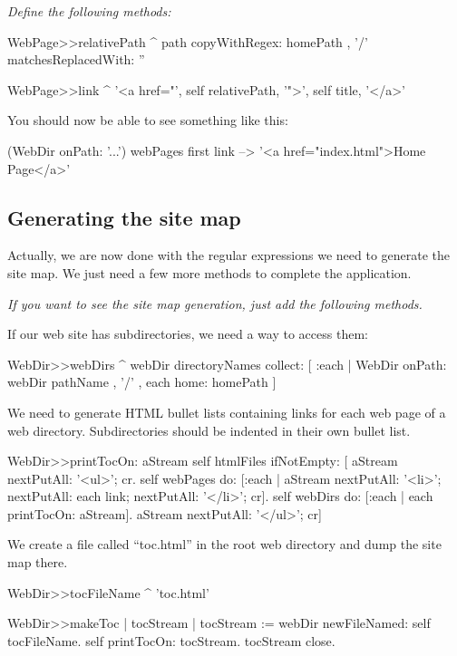 \documentclass[10pt,twoside,chapterprefix=false]{scrbook}
\newcommand{\highlight}[1]{\textcolor{blue!65}{#1}}
\newcommand{\MarginLabel}[1]{%
	\marginnote{\textbf{#1}}}
\newcommand{\vartriangleout}{\ifthenelse{\isodd{\thepage}}{\vartriangleright}{\vartriangleleft}}
\renewcommand{\dothis}[1]{%
	\noindent\par\noindent
	{\reversemarginpar
		\marginnote{\fcolorbox{blue!65}{white}{\highlight{$\vartriangleout$}}}}
	\noindent\emph{#1}
	\nopagebreak}
\begin{document}
\dothis{Define the following methods:}

\begin{ToSh-code}{}
WebPage>>relativePath
	^ path 
		copyWithRegex: homePath , '/'
		matchesReplacedWith: ''

WebPage>>link
	^ '<a href="', self relativePath, '">', self title, '</a>'
\end{ToSh-code}

You should now be able to see something like this:

\begin{ToSh-code}{}
(WebDir onPath: '...') webPages first link --> '<a href="index.html">Home Page</a>'
\end{ToSh-code}

\subsection{Generating the site map}

Actually, we are now done with the regular expressions we need to generate the site map.  We just need a few more methods to complete the application.

\dothis{If you want to see the site map generation, just add the following methods.}

If our web site has subdirectories, we need a way to access them:
\begin{ToSh-code}{}
WebDir>>webDirs
	^ webDir directoryNames
		collect: [ :each | WebDir onPath: webDir pathName , '/' , each home: homePath ]
\end{ToSh-code}

We need to generate HTML bullet lists containing links for each web page of a web directory.
Subdirectories should be indented in their own bullet list.
\begin{ToSh-code}{}
WebDir>>printTocOn: aStream 
	self htmlFiles
		ifNotEmpty: [
			aStream nextPutAll: '<ul>'; cr.
			self webPages
				do: [:each | aStream nextPutAll: '<li>';
						 nextPutAll: each link;
						 nextPutAll: '</li>'; cr].
			self webDirs
				do: [:each | each printTocOn: aStream].
			aStream nextPutAll: '</ul>'; cr]
\end{ToSh-code}

We create a file called ``toc.html'' in the root web directory and dump the site map there.
\begin{ToSh-code}{}
WebDir>>tocFileName
	^ 'toc.html'

WebDir>>makeToc
	| tocStream |
	tocStream := webDir newFileNamed: self tocFileName.
	self printTocOn: tocStream.
	tocStream close.
\end{ToSh-code}
\end{document}
